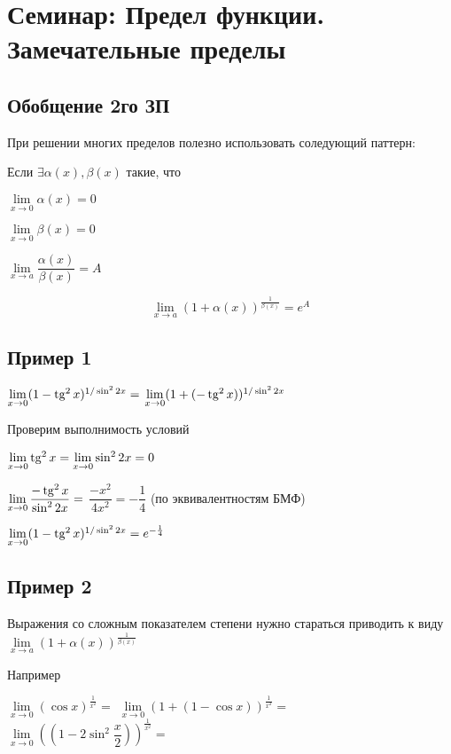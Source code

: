 \section{Семинар: Предел функции. Замечательные пределы}

\subsection{Обобщение 2го ЗП}

При решении многих пределов полезно использовать соледующий паттерн:

Если $ \exists  \alpha(x), \beta(x) $ такие, что 

$ \lim\limits_{x \to 0 } \alpha(x) = 0 $

$ \lim\limits_{x \to 0 } \beta(x) = 0 $

$ \lim\limits_{x \to a } \dfrac{\alpha(x)}{\beta(x)} = A $

$$
\lim\limits_{x \to a } \left( 1 + \alpha(x)  \right )^{\frac{1}{\beta(x)}} = e^{A}
$$

\subsection{Пример 1}

$ \lim\limits_{x \to 0} (1 - \operatorname{tg}^{2}x)^{1/\sin^{2}2x}  = $
$ \lim\limits_{x \to 0} (1 + ( - \operatorname{tg}^{2}x ) )^{1/\sin^{2}2x}$

Проверим выполнимость условий

$ \lim\limits_{x \to 0} \operatorname{tg}^{2}x = \lim\limits_{x \to 0} \sin^{2}2x  = 0$

$ \lim\limits_{x \to 0} \dfrac{- \operatorname{tg}^{2}x}{ \sin^{2}2x } = $
$ \dfrac{- x^{2}}{ 4x^{2} } = - \dfrac{1}{4}$
(по эквивалентностям БМФ)



$ \lim\limits_{x \to 0} (1 - \operatorname{tg}^{2}x)^{1/\sin^{2}2x}  = e^{-\frac{1}{4}}$

\subsection{Пример 2}

Выражения со сложным показателем степени нужно стараться приводить к виду
$ \lim\limits_{x \to a } \left( 1 + \alpha(x)  \right )^{\frac{1}{\beta(x)}} $

Например

$ \lim\limits_{x \to 0} (\cos x)^{\frac{1}{x^{2}}} = $
$ \lim\limits_{x \to 0} (1 + (1- \cos x))^{\frac{1}{x^{2}}} =$
$ \lim\limits_{x \to 0} ((1 - 2 \sin^{2} \dfrac{x}{2} ))^{\frac{1}{x^{2}}} = $

